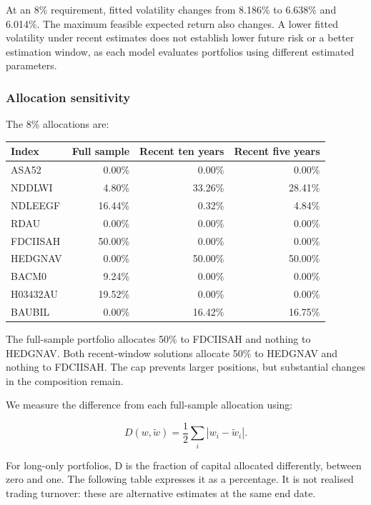 \documentclass[
  10pt,
  a4paper,
]{article}
\begin{document}
At an 8\% requirement, fitted volatility changes from 8.186\% to 6.638\%
and 6.014\%. The maximum feasible expected return also changes. A lower
fitted volatility under recent estimates does not establish lower future
risk or a better estimation window, as each model evaluates portfolios
using different estimated parameters.

\newpage

\hypertarget{allocation-sensitivity}{%
\subsubsection{Allocation sensitivity}\label{allocation-sensitivity}}

The 8\% allocations are:

\begin{longtable}[]{@{}lrrr@{}}
\toprule\noalign{}
Index & Full sample & Recent ten years & Recent five years \\
\midrule\noalign{}
\endhead
\bottomrule\noalign{}
\endlastfoot
ASA52 & 0.00\% & 0.00\% & 0.00\% \\
NDDLWI & 4.80\% & 33.26\% & 28.41\% \\
NDLEEGF & 16.44\% & 0.32\% & 4.84\% \\
RDAU & 0.00\% & 0.00\% & 0.00\% \\
FDCIISAH & 50.00\% & 0.00\% & 0.00\% \\
HEDGNAV & 0.00\% & 50.00\% & 50.00\% \\
BACM0 & 9.24\% & 0.00\% & 0.00\% \\
H03432AU & 19.52\% & 0.00\% & 0.00\% \\
BAUBIL & 0.00\% & 16.42\% & 16.75\% \\
\end{longtable}

The full-sample portfolio allocates 50\% to FDCIISAH and nothing to
HEDGNAV. Both recent-window solutions allocate 50\% to HEDGNAV and
nothing to FDCIISAH. The cap prevents larger positions, but substantial
changes in the composition remain.

We measure the difference from each full-sample allocation using:

\[
D(w,\widetilde w)=\frac12\sum_i|w_i-\widetilde w_i|.
\]

For long-only portfolios, D is the fraction of capital allocated
differently, between zero and one. The following table expresses it as a
percentage. It is not realised trading turnover: these are alternative
estimates at the same end date.
\end{document}
